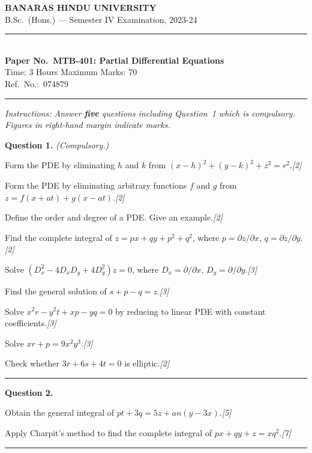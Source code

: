 \documentclass[11pt,a4paper]{article}
\newcommand{\pts}[1]{\hfill   \textit{[#1]}}
\begin{document}
\begin{center}
  {\large\bfseries BANARAS HINDU UNIVERSITY}\\[2pt]
  {\normalsize B.Sc.\ (Hons.) --- Semester IV Examination, 2023-24}\\[6pt]
  \rule{0.8\linewidth}{0.5pt}\\[6pt]
  {\large\bfseries Paper No.\ MTB-401: Partial Differential Equations}\\[4pt]
  {\normalsize Time: 3 Hours \hfill Maximum Marks: 70}\\[2pt]
  {\small Ref.\ No.:\ 074879}
\end{center}
\rule{\linewidth}{0.4pt}
\smallskip



\noindent   \textit{Instructions: Answer   \textbf{five} questions including Question~1 which is compulsory. Figures in right-hand margin indicate marks.}
\bigskip




\noindent   \textbf{Question 1.}   \textit{(Compulsory.)}

\begin{parts}
  \item Form the PDE by eliminating $h$ and $k$ from $(x-h)^2+(y-k)^2+z^2=r^2$.\pts{2}
  \item Form the PDE by eliminating arbitrary functions $f$ and $g$ from $z=f(x+at)+g(x-at)$.\pts{2}
  \item Define the order and degree of a PDE. Give an example.\pts{2}
  \item Find the complete integral of $z=px+qy+p^2+q^2$, where $p=\partial z/\partial x$, $q=\partial z/\partial y$.\pts{2}
  \item Solve $(D_x^2-4D_xD_y+4D_y^2)z=0$, where $D_x=\partial/\partial x$, $D_y=\partial/\partial y$.\pts{3}
  \item Find the general solution of $s+p-q=z$.\pts{3}
  \item Solve $x^2r-y^2t+xp-yq=0$ by reducing to linear PDE with constant coefficients.\pts{3}
  \item Solve $xr+p=9x^2y^3$.\pts{3}
  \item Check whether $3r+6s+4t=0$ is elliptic.\pts{2}
\end{parts}
\medskip\rule{\linewidth}{0.2pt}

\medskip


\noindent   \textbf{Question 2.}

\begin{parts}
  \item Obtain the general integral of $pt+3q=5z+ an(y-3x)$.\pts{5}
  \item Apply Charpit's method to find the complete integral of $px+qy+z=xq^2$.\pts{7}
\end{parts}
\medskip\rule{\linewidth}{0.2pt}
\end{document}
